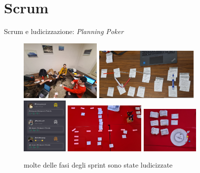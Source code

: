 \documentclass{beamer}
\begin{document}
\section{Scrum}
\begin{frame}{Scrum e ludicizzazione: \emph{Planning Poker}}
	\begin{figure}
		\includegraphics[width=0.35\textwidth]{planning-poker}
		\includegraphics[width=0.45\textwidth]{essence-4-0} \\
		\includegraphics[width=0.2\textwidth]{birdazzone-game}
		\includegraphics[width=0.35\textwidth]{scrumble}
		\includegraphics[width=0.25\textwidth]{scrumble-bis}
		\caption{molte delle fasi degli sprint sono state ludicizzate}
	\end{figure}
\end{frame}
\end{document}
